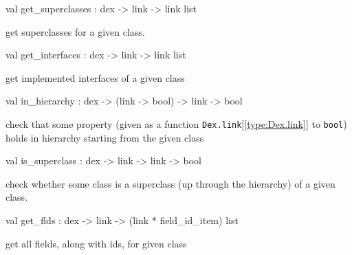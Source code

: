 \documentclass[11pt]{article}
\begin{document}
\label{val:Dex.get-underscoresuperclasses}\begin{ocamldoccode}
val get_superclasses : dex -> link -> link list
\end{ocamldoccode}
\begin{ocamldocdescription}
get superclasses for a given class.


\end{ocamldocdescription}




\label{val:Dex.get-underscoreinterfaces}\begin{ocamldoccode}
val get_interfaces : dex -> link -> link list
\end{ocamldoccode}
\begin{ocamldocdescription}
get implemented interfaces of a given class


\end{ocamldocdescription}




\label{val:Dex.in-underscorehierarchy}\begin{ocamldoccode}
val in_hierarchy : dex -> (link -> bool) -> link -> bool
\end{ocamldoccode}
\begin{ocamldocdescription}
check that some property (given as a function {\tt{Dex.link}}[\ref{type:Dex.link}] to {\tt{bool}})
 holds in hierarchy starting from the given class


\end{ocamldocdescription}




\label{val:Dex.is-underscoresuperclass}\begin{ocamldoccode}
val is_superclass : dex -> link -> link -> bool
\end{ocamldoccode}
\begin{ocamldocdescription}
check whether some class is a superclass (up through the hierarchy) 
    of a given class.


\end{ocamldocdescription}




\label{val:Dex.get-underscoreflds}\begin{ocamldoccode}
val get_flds : dex -> link -> (link * field_id_item) list
\end{ocamldoccode}
\begin{ocamldocdescription}
get all fields, along with ids, for given class


\end{ocamldocdescription}
\end{document}
